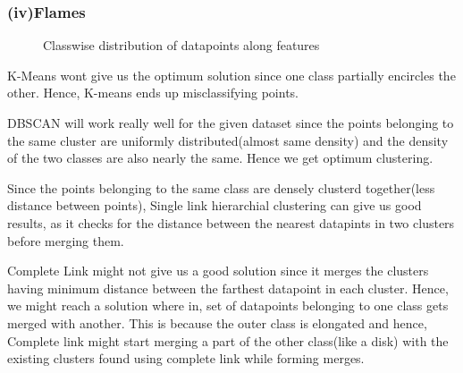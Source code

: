 \documentclass[paper=a4, fontsize=11pt]{scrartcl}
\numberwithin{equation}{section}		%
\numberwithin{figure}{section}			%
\numberwithin{table}{section}				%
\begin{document}
\subsubsection*{(iv)Flames}
\begin{figure}[H]
  \centering
  \hfill
  \caption*{Classwise distribution of datapoints along features}
\end{figure}

K-Means wont give us the optimum solution since one class partially encircles the other. Hence, K-means ends up misclassifying points.

DBSCAN will work really well for the given dataset since the points belonging to the same cluster are uniformly distributed(almost same density) and the density of the two classes are also nearly the same. Hence we get optimum clustering.

Since the points belonging to the same class are densely clusterd together(less distance between points), Single link hierarchial clustering can give us good results, as it checks for the distance between the nearest datapints in two clusters before merging them.

Complete Link might not give us a good solution since it merges the clusters having minimum distance between the farthest datapoint in each cluster. Hence, we might reach a solution where in, set of datapoints belonging to one class gets merged with another. This is because the outer class is elongated and hence, Complete link might start merging a part of the other class(like a disk) with the existing clusters found using complete link while forming merges.
\end{document}
